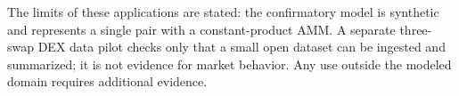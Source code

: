 The limits of these applications are stated: the confirmatory model is synthetic and represents a single pair with a constant-product AMM. A separate three-swap DEX data pilot checks only that a small open dataset can be ingested and summarized; it is not evidence for market behavior. Any use outside the modeled domain requires additional evidence.
